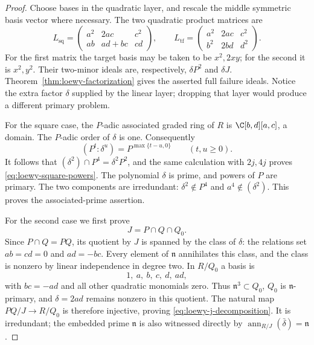 \begin{proof}
Choose bases in the quadratic layer, and rescale the middle symmetric
basis vector where necessary. The two quadratic product matrices are
\[
 L_{\mathrm{sq}}=
 \begin{pmatrix}a^2&2ac&c^2\\ab&ad+bc&cd\end{pmatrix},\qquad
 L_{\mathrm{tf}}=
 \begin{pmatrix}a^2&2ac&c^2\\b^2&2bd&d^2\end{pmatrix}.
\]
For the first matrix the target basis may be taken to be $x^2,2xy$;
for the second it is $x^2,y^2$. Their two-minor ideals are, respectively,
$\delta P^2$ and $\delta J$. Theorem~\ref{thm:loewy-factorization}
gives the asserted full failure ideals. Notice the extra factor
$\delta$ supplied by the linear layer; dropping that layer would
produce a different primary problem.

For the square case, the $P$-adic associated graded ring of $R$ is
$\C[b,d][a,c]$, a domain. The $P$-adic order of $\delta$ is one.
Consequently
\[
 (P^t:\delta^u)=P^{\max\{t-u,0\}}\qquad(t,u\ge0).
\]
It follows that $(\delta^2)\cap P^4=\delta^2P^2$, and the same
calculation with $2j,4j$ proves \eqref{eq:loewy-square-powers}.
The polynomial $\delta$ is prime, and powers of $P$ are primary.
The two components are irredundant: $\delta^2\notin P^4$ and
$a^4\notin(\delta^2)$. This proves the associated-prime assertion.

For the second case we first prove
\begin{equation}\label{eq:loewy-j-decomposition}
 J=P\cap Q\cap Q_0.
\end{equation}
Since $P\cap Q=PQ$, its quotient by $J$ is spanned by the class of
$\delta$: the relations set $ab=cd=0$ and $ad=-bc$. Every element
of $\mathfrak n$ annihilates this class, and the class is nonzero
by linear independence in degree two. In $R/Q_0$ a basis is
\[
 1,\ a,\ b,\ c,\ d,\ ad,
\]
with $bc=-ad$ and all other quadratic monomials zero. Thus
$\mathfrak n^3\subset Q_0$, $Q_0$ is $\mathfrak n$-primary, and
$\delta=2ad$ remains nonzero in this quotient. The natural map
$PQ/J\to R/Q_0$ is therefore injective, proving
\eqref{eq:loewy-j-decomposition}. It is irredundant; the embedded
prime $\mathfrak n$ is also witnessed directly by
$\operatorname{ann}_{R/J}(\bar\delta)=\mathfrak n$.


\end{proof}
